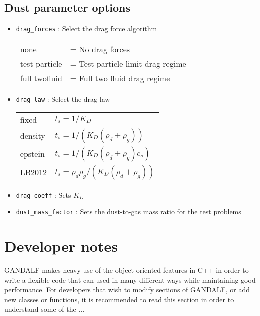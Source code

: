 \documentclass[a4paper]{article}
\newcommand{\var}[1]{\texttt{#1}}
\begin{document}
\subsection{Dust parameter options}
\begin{itemize}

\item \var{drag\_forces} : Select the drag force algorithm

\begin{tabular}{ll}
none              & = No drag forces \\
test particle     & = Test particle limit drag regime \\
full twofluid     & = Full two fluid drag regime
\end{tabular} 

\item \var{drag\_law} : Select the drag law

\begin{tabular}{ll}
fixed             & $t_s = 1 / K_D$ \\
density           & $t_s = 1 / (K_D(\rho_d + \rho_g))$ \\
epstein           & $t_s = 1 / (K_D(\rho_d + \rho_g)c_s)$ \\
LB2012            & $t_s = \rho_d \rho_g / (K_D(\rho_d + \rho_g))$ \\
\end{tabular} 

\item \var{drag\_coeff} : Sets $K_D$

\item \var{dust\_mass\_factor} : Sets the dust-to-gas mass ratio for the test problems

\end{itemize}

\newpage

\section{Developer notes}
GANDALF makes heavy use of the object-oriented features in C++ in order to write a flexible code that can used in many different ways while maintaining good performance.  For developers that wish to modify sections of GANDALF, or add new classes or functions, it is recommended to read this section in order to understand some of the ...


\end{document}
